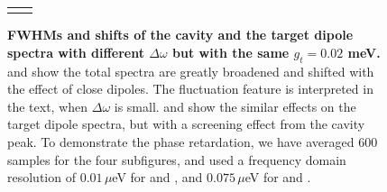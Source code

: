 \begin{figure}[htp]
\begin{tabular}{cc}
{    \label{Stshift_wdrand5-90s20_gt0.02b0.5_qd2000_stat200}}
\end{tabular}
\caption[Modification effect of different $\Delta\omega$ when $g_t=0.02$ meV.]{\textbf{FWHMs and shifts of the cavity and the target dipole spectra with different $\Delta\omega$ but with the same $g_t=0.02$ meV.}  and  show the total spectra are greatly broadened and shifted with the effect of close dipoles. The fluctuation feature is interpreted in the text, when $\Delta\omega$ is small.  and  show the similar effects on the target dipole spectra, but with a screening effect from the cavity peak. To demonstrate the phase retardation, we have averaged 600 samples for the four subfigures, and used a frequency domain resolution of $0.01\,\mu$eV for  and , and $0.075\,\mu$eV for  and . }
\label{fwhm_shift_gt0.02_dw}
\end{figure}

